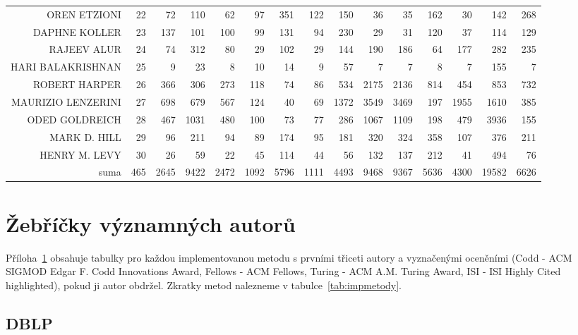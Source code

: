\documentclass{bakalarka}
\begin{document}
\begin{table}[!ht]
\begin{sideways}
\begin{scriptsize}
\begin{tabular}{r|r|rrrrrrrrrrrrr}
OREN ETZIONI&22&72&110&62&97&351&122&150&36&35&162&30&142&268\\
DAPHNE KOLLER&23&137&101&100&99&131&94&230&29&31&120&37&114&129\\
RAJEEV ALUR&24&74&312&80&29&102&29&144&190&186&64&177&282&235\\
HARI BALAKRISHNAN&25&9&23&8&10&14&9&57&7&7&8&7&155&7\\
ROBERT HARPER&26&366&306&273&118&74&86&534&2175&2136&814&454&853&732\\
MAURIZIO LENZERINI&27&698&679&567&124&40&69&1372&3549&3469&197&1955&1610&385\\
ODED GOLDREICH&28&467&1031&480&100&73&77&286&1067&1109&198&479&3936&155\\
MARK D. HILL&29&96&211&94&89&174&95&181&320&324&358&107&376&211\\
HENRY M. LEVY&30&26&59&22&45&114&44&56&132&137&212&41&494&76\\
\midrule
suma&465&2645&9422&2472&1092&5796&1111&4493&9468&9367&5636&4300&19582&6626\\
\bottomrule
\end{tabular}
\end{scriptsize}
\end{sideways}
\end{table}

\newpage
\chapter{Žebříčky významných autorů}
\label{chapter:zebricky}

Příloha~\ref{chapter:zebricky} obsahuje tabulky pro každou implementovanou
metodu s prvními třiceti autory a vyznačenými oceněními (Codd - ACM SIGMOD
Edgar F. Codd Innovations Award, Fellows - ACM Fellows, Turing - ACM A.M.
Turing Award, ISI - ISI Highly Cited highlighted), pokud ji autor obdržel.
Zkratky metod nalezneme v tabulce~\ref{tab:impmetody}.

\newpage
\section{DBLP}
\label{section:zebrickydblp}















\end{document}
